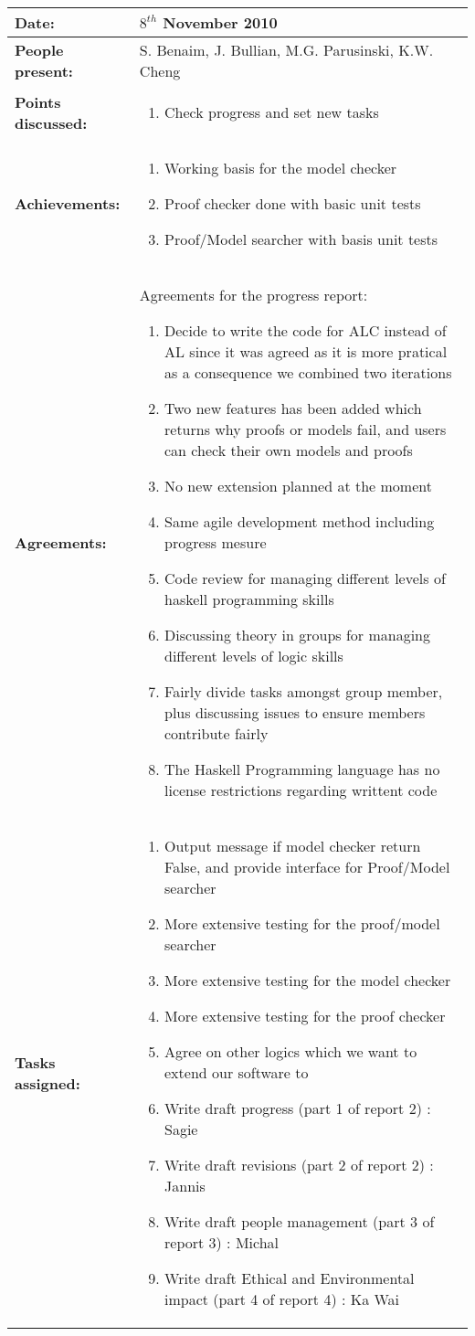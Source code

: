 \documentclass[12pt,a4paper]{article}
\newcommand{\meeting}[6]{%
\begin{center}%
\begin{longtable}{| p{3.5cm} | | p{13cm} |}%
\hline%
\textbf{Date:} & #1 \\%
\hline%
\textbf{People present:} &#2 \\%
\hline%
\textbf{Points discussed:} &#3\\%
\hline%
\textbf{Achievements:} &#4 \\%
\hline%
\textbf{Agreements:} &#5 \\%
\hline%
\textbf{Tasks assigned:} &#6  \\%
\hline%
\end{longtable}%
\end{center}%
\bigbreak
}
\begin{document}
\meeting{$8^{th}$ November 2010}%
{S. Benaim, J. Bullian, M.G. Parusinski, K.W. Cheng}%
{\begin{enumerate} 
\item Check progress and set new tasks
\end{enumerate} }%
{\begin{enumerate}
\item Working basis for the model checker
\item Proof checker done with basic unit tests
\item Proof/Model searcher with basis unit tests
\end{enumerate}}%
{Agreements for the progress report: \begin{enumerate}
\item Decide to write the code for ALC instead of AL since it was agreed as it is more pratical as a consequence we combined two iterations
\item Two new features has been added which returns why proofs or models fail, and users can check their own models and proofs
\item No new extension planned at the moment
\item Same agile development method including progress mesure
\item Code review for managing different levels of haskell programming skills
\item Discussing theory in groups for managing different levels of logic skills
\item Fairly divide tasks amongst group member, plus discussing issues to ensure members contribute fairly
\item The Haskell Programming language has no license restrictions regarding writtent code
\end{enumerate}}
{\begin{enumerate}
\item Output message if model checker return False, and provide interface for Proof/Model searcher
\item More extensive testing for the proof/model searcher
\item More extensive testing for the model checker
\item More extensive testing for the proof checker
\item Agree on other logics which we want to extend our software to
\item Write draft progress (part 1 of report 2) : Sagie
\item Write draft revisions (part 2 of report 2) : Jannis
\item Write draft people management (part 3 of report 3) : Michal
\item Write draft Ethical and Environmental impact (part 4 of report 4) : Ka Wai
\end{enumerate}}%
\end{document}
